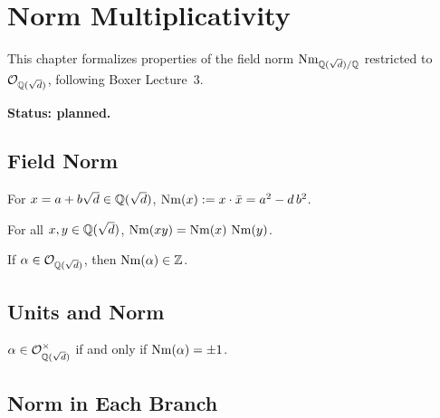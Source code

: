 \chapter{Norm Multiplicativity}\label{ch:norm}

This chapter formalizes properties of the field norm
$\operatorname{Nm}_{\mathbb{Q}(\sqrt{d})/\mathbb{Q}}$ restricted to $\mathcal{O}_{\mathbb{Q}(\sqrt{d})}$,
following Boxer Lecture~3.

\textbf{Status: planned.}

\section{Field Norm}

\begin{definition}
  \label{def:plan_field_norm}
  \notready
  For $x = a + b\sqrt{d}\in\mathbb{Q}(\sqrt{d})$,
  $\operatorname{Nm}(x) := x\cdot\bar{x} = a^2 - d\,b^2$.
\end{definition}

\begin{theorem}[Multiplicativity]\label{thm:plan_norm_mul}
  \notready
  For all $x,y\in\mathbb{Q}(\sqrt{d})$,
  $\operatorname{Nm}(xy) = \operatorname{Nm}(x)\,\operatorname{Nm}(y)$.
\end{theorem}

\begin{corollary}\label{cor:plan_norm_int}
  \notready
  If $\alpha\in\mathcal{O}_{\mathbb{Q}(\sqrt{d})}$, then $\operatorname{Nm}(\alpha)\in\mathbb{Z}$.
\end{corollary}

\section{Units and Norm}

\begin{proposition}\label{prop:plan_unit_norm}
  \notready
  $\alpha\in\mathcal{O}_{\mathbb{Q}(\sqrt{d})}^\times$ if and only if $\operatorname{Nm}(\alpha) = \pm 1$.
\end{proposition}

\section{Norm in Each Branch}


